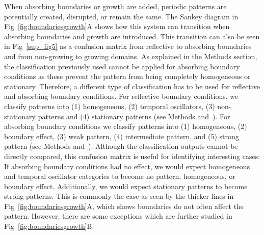 When absorbing boundaries or growth are added, periodic patterns are potentially created, disrupted, or remain the same.
The Sankey diagram in Fig~\ref{fig:boundariesgrowth}A shows how this system can transition when absorbing boundaries and growth are introduced.
This transition can also be seen in Fig~\ref{sup_fig5} as a confusion matrix from reflective to absorbing boundaries and from non-growing to growing domains.
As explained in the Methods section, the classification previously used cannot be applied for absorbing boundary conditions as these prevent the pattern from being completely homogeneous or stationary.  %
Therefore, a different type of classification has to be used for reflective and absorbing boundary conditions.
For reflective boundary conditions, we classify patterns into (1) homogeneous, (2) temporal oscillators, (3) non-stationary patterns and (4) stationary patterns (see Methods and~). For absorbing boundary conditions we classify patterns into (1) homogeneous, (2) boundary effect, (3) weak pattern, (4) intermediate pattern, and (5) strong pattern (see Methods and~).
Although the classification outputs cannot be directly compared, this confusion matrix is useful for identifying interesting cases:
If absorbing boundary conditions had no effect, we would expect homogeneous and temporal oscillator categories to become no pattern, homogeneous, or boundary effect.
Additionally, we would expect stationary patterns to become strong patterns.
This is commonly the case as seen by the thicker lines in Fig~\ref{fig:boundariesgrowth}A, which shows boundaries do not often affect the pattern.
However, there are some exceptions which are further studied in Fig~\ref{fig:boundariesgrowth}B.

